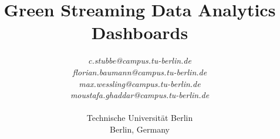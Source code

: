 \label{sec:title}
\title{Green Streaming Data Analytics Dashboards}







\author{
\textit{c.stubbe@campus.tu-berlin.de} \\
\textit{florian.baumann@campus.tu-berlin.de} \\
\textit{max.wessling@campus.tu-berlin.de} \\
\textit{moustafa.ghaddar@campus.tu-berlin.de} \\ \\

Technische Universität Berlin \\
Berlin, Germany
}